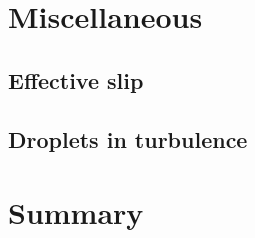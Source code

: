 \chapter{Miscellaneous}

\section{Effective slip}

\section{Droplets in turbulence}


\chapter{Summary}






